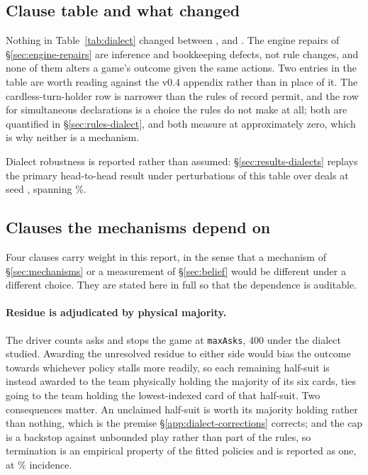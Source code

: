 \subsection{Clause table and what changed}
\label{app:dialect-table}

Nothing in Table~\ref{tab:dialect} changed between \vfour{}, \vfive{} and
\vsix{}. The engine repairs of \S\ref{sec:engine-repairs} are inference and
bookkeeping defects, not rule changes, and none of them alters a game's outcome
given the same actions. Two entries in the table are worth reading against the
v0.4 appendix rather than in place of it. The cardless-turn-holder row is
narrower than the rules of record permit, and the row for simultaneous
declarations is a choice the rules do not make at all; both are quantified in
\S\ref{sec:rules-dialect}, and both measure at approximately zero, which is why
neither is a \vsix{} mechanism.

Dialect robustness is reported rather than assumed: \S\ref{sec:results-dialects}
replays the primary head-to-head result under \vsixDialectN{} perturbations of
this table over \vsixDialectDeals{} deals at seed \vsixDialectSeed{}, spanning
\vsixDialectSpan{}\%.

\subsection{Clauses the \vsix{} mechanisms depend on}
\label{app:dialect-depends}

Four clauses carry weight in this report, in the sense that a mechanism of
\S\ref{sec:mechanisms} or a measurement of \S\ref{sec:belief} would be different
under a different choice. They are stated here in full so that the dependence is
auditable.

\paragraph{Residue is adjudicated by physical majority.} The driver counts asks
and stops the game at \texttt{maxAsks}, 400 under the dialect studied. Awarding
the unresolved residue to either side would bias the outcome towards whichever
policy stalls more readily, so each remaining half-suit is instead awarded to
the team physically holding the majority of its six cards, ties going to the
team holding the lowest-indexed card of that half-suit. Two consequences matter.
An unclaimed half-suit is worth its majority holding rather than nothing, which
is the premise \S\ref{app:dialect-corrections} corrects; and the cap is a
backstop against unbounded play rather than part of the rules, so termination is
an empirical property of the fitted policies and is reported as one, at
\vsixLimitRate{}\% incidence.

